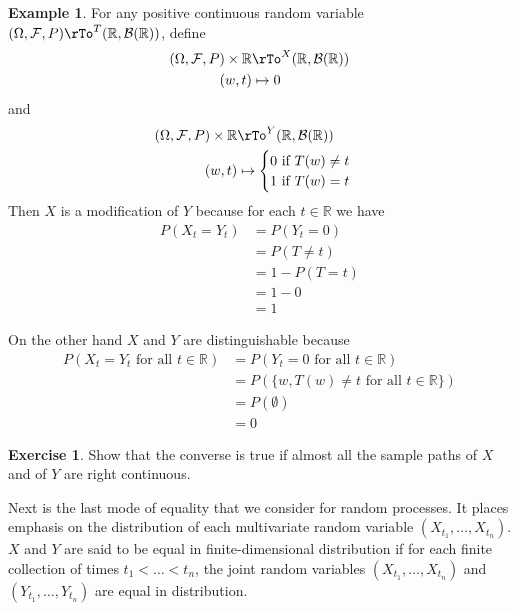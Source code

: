 \documentclass[12pt]{amsart}
\theoremstyle{definition}
\newtheorem{example}[theorem]{Example}
\newtheorem{exercise}[theorem]{Exercise}
\begin{document}
\begin{example} \label{modified_not_indistinguishable} For any positive continuous random variable $(\Omega, \mathcal{F}, P) \rTo^T (\mathbb{R}, \mathcal{B}(\mathbb{R}))$, define
\begin{align*}
(\Omega, \mathcal{F}, P) \times \mathbb{R} & \rTo^X (\mathbb{R}, \mathcal{B}(\mathbb{R})) \\
(w, t) & \mapsto 0
\end{align*}
and
\begin{align*}
(\Omega, \mathcal{F}, P) \times \mathbb{R} & \rTo^Y (\mathbb{R}, \mathcal{B}(\mathbb{R})) \\
(w, t) & \mapsto \begin{cases} 0 \text{ if } T(w) \neq t \\ 1 \text{ if } T(w) = t \end{cases}
\end{align*}
Then $X$ is a modification of $Y$ because for each $t \in \mathbb{R}$ we have
\begin{align*}
P(X_t = Y_t) & = P(Y_t = 0) \\
 & = P(T \neq t) \\
 & = 1 - P(T = t) \\
 & = 1 - 0 \\
 & = 1
\end{align*}

On the other hand $X$ and $Y$ are distinguishable because
\begin{align*}
P(X_t = Y_t \text{ for all } t \in \mathbb{R}) & = P(Y_t = 0 \text{ for all } t \in \mathbb{R}) \\
 & = P(\{w, T(w) \neq t \text{ for all } t \in \mathbb{R}\}) \\
 & = P(\emptyset) \\
 & = 0
\end{align*}
\end{example}

\begin{exercise} Show that the converse is true if almost all the sample paths of $X$ and of $Y$ are right continuous.
\end{exercise}

Next is the last mode of equality that we consider for random processes. It places emphasis on the distribution of each multivariate random variable $(X_{t_1}, \dots , X_{t_n})$.
\dfn $X$ and $Y$ are said to be equal in finite-dimensional distribution if for each finite collection of times $t_1 < \dots < t_n$, the joint random variables $(X_{t_1}, \dots , X_{t_n})$ and $(Y_{t_1}, \dots , Y_{t_n})$ are equal in distribution.
\end{document}
